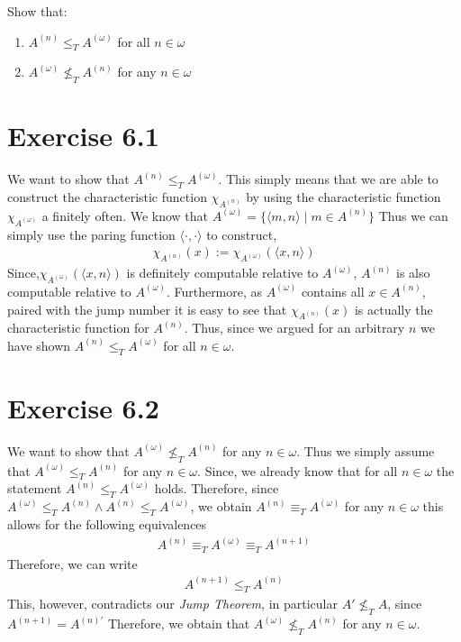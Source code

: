 \documentclass[11pt,a4paper]{article}
\begin{document}
Show that:
\begin{enumerate}
\item  $A^{(n)} \leq_T A^{(\omega)}$ for all $n \in \omega$
\item	$A^{(\omega)} \nleq_T A^{(n)} $ for any  $n \in \omega$
\end{enumerate}

\section*{Exercise 6.1}
We want to show that $A^{(n)} \leq_T A^{(\omega)}$. This simply means that
we are able to construct the characteristic function $\chi_{A^{(n)}}$ by using 
the characteristic function  $\chi_{A^{(\omega)}}$ a finitely often.
We know that $A^{(\omega)} =\{\langle m,n \rangle \mid m \in A^{(n)}\}$
Thus we can simply use the paring function $\langle \cdot,\cdot \rangle$ to construct,
\begin{equation*}
\begin{split}
\chi_{A^{(n)}}(x) := \chi_{A^{(\omega)}}(\langle x,n \rangle)
\end{split}
\end{equation*}
Since,$\chi_{A^{(\omega)}}(\langle x,n \rangle)$ is definitely computable relative to $A^{(\omega)}$, $A^{(n)}$ is also computable 
relative to  $A^{(\omega)}$. Furthermore, as $A^{(\omega)}$ contains all $x \in A^{(n)}$, paired with the jump number it is easy 
to see that $\chi_{A^{(n)}}(x)$ is actually the characteristic function for $A^{(n)}$. Thus, since we argued for an arbitrary $n$ we have shown $A^{(n)} \leq_T A^{(\omega)}$ for all $n \in \omega$.

\section*{Exercise 6.2}
We want to show that $A^{(\omega)} \nleq_T A^{(n)} $ for any  $n \in \omega$.
Thus we simply assume that $A^{(\omega)} \leq_T A^{(n)} $ for any  $n \in \omega$.
Since, we already know that for all $n \in \omega$ the statement $A^{(n)} \leq_T A^{(\omega)}$ holds. Therefore, since $A^{(\omega)} \leq_T A^{(n)} \wedge A^{(n)} \leq_T A^{(\omega)}$, we obtain $A^{(n)} \equiv_T A^{(\omega)}$ for any $n \in \omega$ this allows for the following equivalences
\begin{equation*}
\begin{split}
A^{(n)} \equiv_T A^{(\omega)} \equiv_T A^{(n+1)} 
\end{split}
\end{equation*}
Therefore, we can write
\begin{equation*}
\begin{split}
A^{(n+1)} \leq_T A^{(n)} 
\end{split}
\end{equation*}
This, however, contradicts our \emph{Jump Theorem}, in particular $A' \nleq_T A $, since
$A^{(n+1)} = A^{(n)'}$
Therefore, we obtain that $A^{(\omega)} \nleq_T A^{(n)} $ for any  $n \in \omega$.
\end{document}
